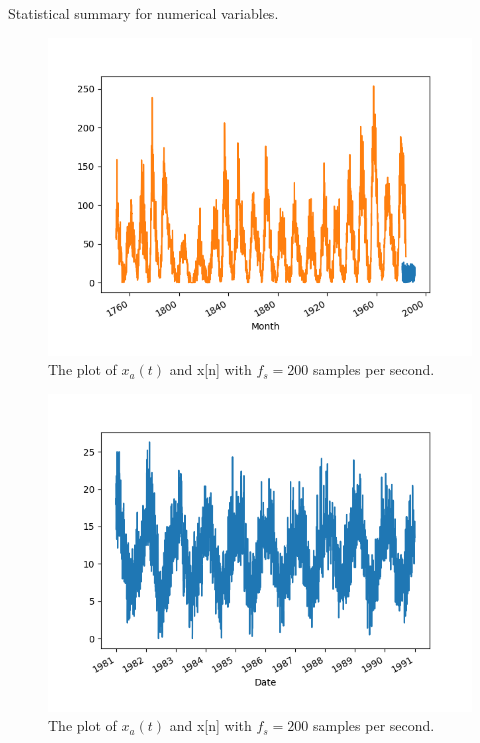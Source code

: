 \documentclass[12pt]{article}
\begin{document}
\begin{enumerate}
	\begin{table}[]
	 \centering
	\caption{Statistical summary for numerical variables.
	{\label{tab:stats_num_data}}}
	
	\end{table}


\begin{figure}[H]
    \centering
    \begin{minipage}[b]{0.8\textwidth}
        \includegraphics[width=\textwidth]{figures/sun.png}
    \end{minipage}
    \caption{The plot of $x_a(t)$ and x[n] with $f_s = 200$ samples per second.}
    \label{fig:1}
\end{figure}

\begin{figure}[H]
    \centering
    \begin{minipage}[b]{0.8\textwidth}
        \includegraphics[width=\textwidth]{figures/temp.png}
    \end{minipage}
    \caption{The plot of $x_a(t)$ and x[n] with $f_s = 200$ samples per second.}
    \label{fig:2}
\end{figure}





\end{enumerate}
\end{document}
